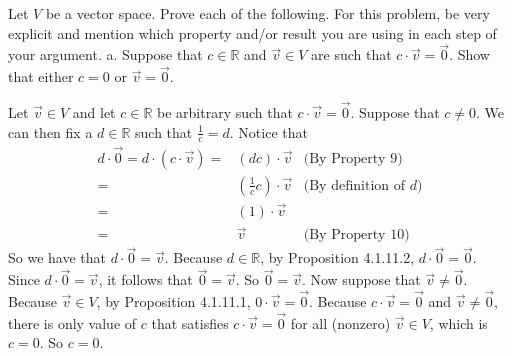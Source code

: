 \documentclass[12pt]{article}
\newenvironment{problem}[2][Problem]
{
	\begin{trivlist} 
		\item[\hskip \labelsep {\bfseries #1 #2:}]
	}
{
	\end{trivlist}
	}
\newenvironment{solution}[1][Solution]
{
	\begin{trivlist} 
		\item[\hskip \labelsep {\itshape #1:}]
	}
	{
	\end{trivlist}
}
\begin{document}
\begin{problem}{1}
Let $V$ be a vector space. Prove each of the following. For this problem, be very explicit and mention which property and/or result you are using in each step of your argument.
\noindent
\newline
\newline
a. Suppose that $c \in \mathbb{R}$ and $\vec{v} \in V$ are such that $c\cdot \vec{v} = \vec{0}$. Show that either $c=0$ or $\vec{v}=\vec{0}$.
\begin{solution}
Let $\vec{v} \in V$ and let $c\in \mathbb{R}$ be arbitrary such that $c\cdot \vec{v} =\vec{0}$.
\newline
\newline
\noindent
Suppose that $c \neq 0$. We can then fix a $d\in \mathbb{R}$ such that $\frac{1}{c} = d$. Notice that
\begin{align*}
d\cdot \vec{0} = d\cdot (c\cdot \vec{v}) =& (dc) \cdot \vec{v} & \text{(By Property 9)}\\
=& (\frac{1}{c} c) \cdot \vec{v} &\text{(By definition of $d$)}\\
=& (1) \cdot \vec{v} &\\
=& \vec{v} &\text{(By Property 10)}
\end{align*}
So we have that $d\cdot \vec{0} = \vec{v}$. Because $d \in \mathbb{R}$, by Proposition 4.1.11.2, $d\cdot \vec{0} = \vec{0}$. Since $d\cdot \vec{0} =\vec{v}$, it follows that $\vec{0} =\vec{v}$. So $\vec{0} = \vec{v}$.
\newline
\newline
\noindent
Now suppose that $\vec{v} \neq \vec{0}$. Because $\vec{v} \in V$, by Proposition 4.1.11.1, $0\cdot \vec{v} =\vec{0}$. Because $c\cdot \vec{v} =\vec{0}$ and $\vec{v} \neq \vec{0}$, there is only value of $c$ that satisfies $c \cdot \vec{v} =\vec{0}$ for all (nonzero) $\vec{v} \in V$, which is $c=0$. So $c=0$.

\end{solution}
\end{problem}
\end{document}
